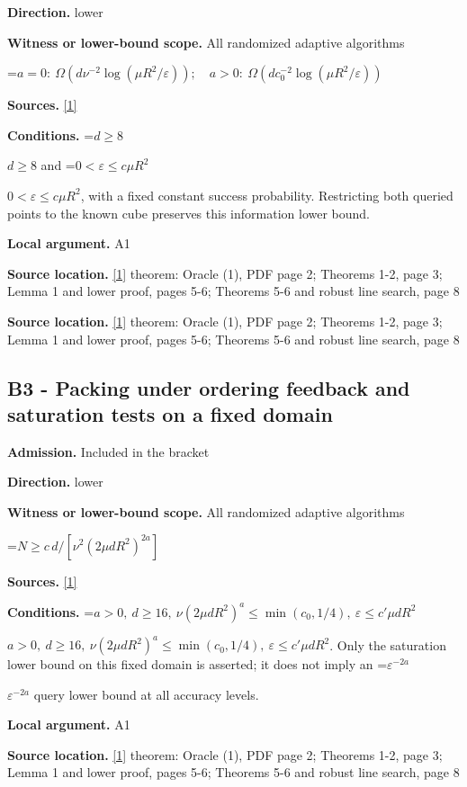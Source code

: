 \documentclass[10pt,a4paper]{article}
\newcommand{\AtlasMath}[1]{\par\begingroup\centering\setbox0=\hbox{$\displaystyle #1$}\ifdim\wd0>1.4\linewidth\typeout{ATLAS WIDE FORMULA: \the\wd0}\fi\ifdim\wd0>\linewidth\resizebox{\linewidth}{!}{\box0}\else\box0\fi\par\endgroup}
\newcommand{\AtlasInlineMath}[1]{\begingroup\setbox0=\hbox{$#1$}\ifdim\wd0>.4\linewidth\endgroup\AtlasMath{#1}\else\endgroup$#1$\fi}
\begin{document}
\textbf{Direction.} lower

\textbf{Witness or lower-bound scope.} All randomized adaptive algorithms

\AtlasMath{a=0:\ \Omega\!\left(d\nu^{-2}\log(\mu R^2/\varepsilon)\right);\quad a>0:\ \Omega\!\left(dc_0^{-2}\log(\mu R^2/\varepsilon)\right)}
\textbf{Sources.} \href{https://papers.nips.cc/paper_files/paper/2012/file/e6d8545daa42d5ced125a4bf747b3688-Paper.pdf}{[1]}

\textbf{Conditions.} \AtlasInlineMath{d\ge8} and \AtlasInlineMath{0<\varepsilon\le c\mu R^2}, with a fixed constant success probability. Restricting both queried points to the known cube preserves this information lower bound.

\textbf{Local argument.} A1

\textbf{Source location.} \href{https://papers.nips.cc/paper_files/paper/2012/file/e6d8545daa42d5ced125a4bf747b3688-Paper.pdf}{[1]} theorem: Oracle (1), PDF page 2; Theorems 1-2, page 3; Lemma 1 and lower proof, pages 5-6; Theorems 5-6 and robust line search, page 8

\textbf{Source location.} \href{https://papers.nips.cc/paper_files/paper/2012/file/e6d8545daa42d5ced125a4bf747b3688-Paper.pdf}{[1]} theorem: Oracle (1), PDF page 2; Theorems 1-2, page 3; Lemma 1 and lower proof, pages 5-6; Theorems 5-6 and robust line search, page 8

\subsection{B3 - Packing under ordering feedback and saturation tests on a fixed domain}
\textbf{Admission.} Included in the bracket

\textbf{Direction.} lower

\textbf{Witness or lower-bound scope.} All randomized adaptive algorithms

\AtlasMath{N\ge c\,d/[\nu^2(2\mu dR^2)^{2a}]}
\textbf{Sources.} \href{https://papers.nips.cc/paper_files/paper/2012/file/e6d8545daa42d5ced125a4bf747b3688-Paper.pdf}{[1]}

\textbf{Conditions.} \AtlasInlineMath{a>0,\ d\ge16,\ \nu(2\mu dR^2)^a\le\min(c_0,1/4),\ \varepsilon\le c'\mu dR^2}. Only the saturation lower bound on this fixed domain is asserted; it does not imply an \AtlasInlineMath{\varepsilon^{-2a}} query lower bound at all accuracy levels.

\textbf{Local argument.} A1

\textbf{Source location.} \href{https://papers.nips.cc/paper_files/paper/2012/file/e6d8545daa42d5ced125a4bf747b3688-Paper.pdf}{[1]} theorem: Oracle (1), PDF page 2; Theorems 1-2, page 3; Lemma 1 and lower proof, pages 5-6; Theorems 5-6 and robust line search, page 8
\end{document}
